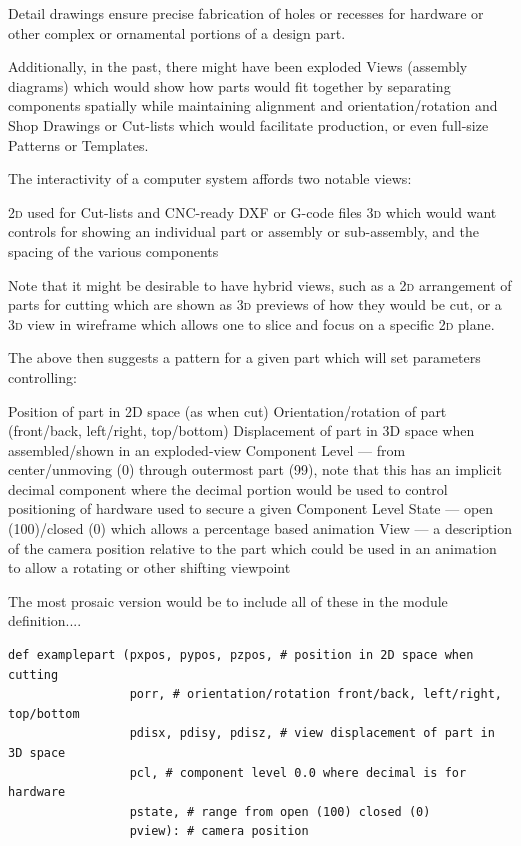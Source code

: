 \documentclass{ltxdoc}
\begin{document}
Detail drawings ensure precise fabrication of holes or recesses for hardware or other complex or ornamental portions of a design part.

Additionally, in the past, there might have been exploded Views (assembly diagrams) which would show how parts would fit together by separating components spatially while maintaining alignment and orientation/rotation and Shop Drawings or Cut-lists which would facilitate production, or even full-size Patterns or Templates.

The interactivity of a computer system affords two notable views:

\begin{outline}
\1 \textsc{2d} used for Cut-lists and CNC-ready DXF or G-code files 
\1 \textsc{3d} which would want controls for showing an individual part or assembly or sub-assembly, and the spacing of the various components
\end{outline}

\noindent Note that it might be desirable to have hybrid views, such as a \textsc{2d} arrangement of parts for cutting which are shown as \textsc{3d} previews of how they would be cut, or a \textsc{3d} view in wireframe which allows one to slice and focus on a specific \textsc{2d} plane.

The above then suggests a pattern for a given part which will set parameters controlling:

\begin{outline}
\1 Position of part in 2D space (as when cut)
\1 Orientation/rotation of part (front/back, left/right, top/bottom)
\1 Displacement of part in 3D space when assembled/shown in an exploded-view
\1 Component Level --- from center/unmoving (0) through outermost part (99), note that this has an implicit decimal component where the decimal portion would be used to control positioning of hardware used to secure a given Component Level
\1 State --- open (100)/closed (0) which allows a percentage based animation
\1 View --- a description of the camera position relative to the part which could be used in an animation to allow a rotating or other shifting viewpoint
\end{outline}

\noindent The most prosaic version would be to include all of these in the module definition....

\begin{verbatim}
def examplepart (pxpos, pypos, pzpos, # position in 2D space when cutting
                 porr, # orientation/rotation front/back, left/right, top/bottom
                 pdisx, pdisy, pdisz, # view displacement of part in 3D space 
                 pcl, # component level 0.0 where decimal is for hardware
                 pstate, # range from open (100) closed (0)
                 pview): # camera position
    
\end{verbatim}
\end{document}
